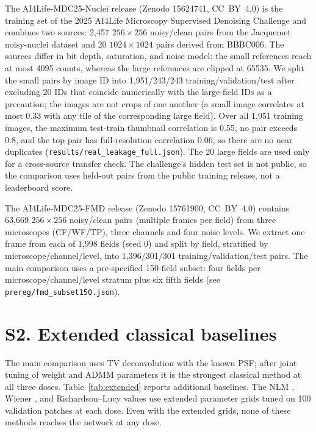 \documentclass[11pt]{article}
\begin{document}
The AI4Life-MDC25-Nuclei release (Zenodo 15624741, CC~BY~4.0) is the training
set of the 2025 AI4Life Microscopy Supervised Denoising Challenge and combines
two sources: 2{,}457
$256\times256$ noisy/clean pairs from the Jacquemet noisy-nuclei dataset and 20
$1024\times1024$ pairs derived from BBBC006. The sources differ in bit depth,
saturation, and noise model: the small references reach at most 4095 counts,
whereas the large references are clipped at 65535. We split the small pairs by
image ID into 1{,}951/243/243 training/validation/test after excluding 20 IDs
that coincide numerically with the large-field IDs as a precaution; the images
are not crops of one another (a small image correlates at most 0.33 with any
tile of the corresponding large field). Over all 1{,}951 training images, the
maximum test-train thumbnail correlation is 0.55, no pair exceeds 0.8, and the
top pair has full-resolution correlation 0.06, so there are no near duplicates
(\texttt{results/real\_leakage\_full.json}). The 20 large fields are used only
for a cross-source transfer check. The challenge's hidden test set is not
public, so the comparison uses held-out pairs from the public training release,
not a leaderboard score.

The AI4Life-MDC25-FMD release (Zenodo 15761900, CC~BY~4.0) contains 63{,}669
$256\times256$ noisy/clean pairs (multiple frames per field) from three
microscopes (CF/WF/TP), three channels and four noise levels. We extract one
frame from each of 1{,}998 fields (seed 0) and split by field, stratified by
microscope/channel/level, into 1{,}396/301/301 training/validation/test pairs.
The main comparison uses a pre-specified 150-field subset: four fields per
microscope/channel/level stratum plus six fifth fields (see
\texttt{prereg/fmd\_subset150.json}).

\section*{S2. Extended classical baselines}
The main comparison uses TV deconvolution with the known PSF; after joint
tuning of weight and ADMM parameters it is the strongest classical method at
all three doses. Table~\ref{tab:extended} reports additional baselines. The
NLM \cite{buades2005}, Wiener \cite{wiener1949}, and Richardson--Lucy
\cite{richardson1972,lucy1974} values use extended parameter grids tuned on
100 validation patches at each dose. Even with the extended grids, none of these methods
reaches the network at any dose.
\end{document}
